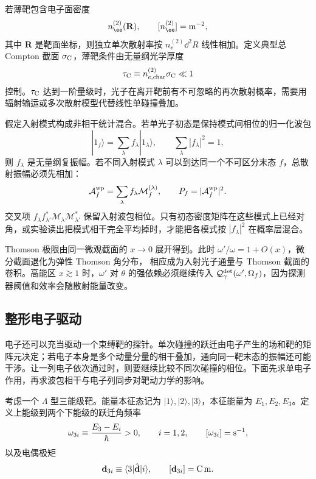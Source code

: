 若薄靶包含电子面密度
\begin{equation*}
n_\ee^{(2)}(\mathbf R),
\qquad
[n_\ee^{(2)}]={\rm m^{-2}},
\end{equation*}
其中 $\mathbf R$ 是靶面坐标，则独立单次散射率按 $n_\ee^{(2)}\dd^2 R$ 线性相加。定义典型总 Compton 截面 $\sigma_{\rm C}$，薄靶条件由无量纲光学厚度
\begin{equation*}
\tau_{\rm C}
\equiv n_{e,{\rm char}}^{(2)}\sigma_{\rm C}
\ll1
\end{equation*}
控制。$\tau_{\rm C}$ 达到一阶量级时，光子在离开靶前有不可忽略的再次散射概率，需要用辐射输运或多次散射模型代替线性单碰撞叠加。

 假定入射模式构成非相干统计混合。若单光子初态是保持模式间相位的归一化波包
\begin{equation*}
|1_f\rangle
=\sum_\lambda f_\lambda|1_\lambda\rangle,
\qquad
\sum_\lambda|f_\lambda|^2=1,
\end{equation*}
则 $f_\lambda$ 是无量纲复振幅。若不同入射模式 $\lambda$ 可以到达同一个不可区分末态 $f$，总散射振幅必须先相加：
\begin{equation*}
\mathcal A_f^{\rm wp}
=\sum_\lambda f_\lambda\mathcal M_f^{(\lambda)},
\qquad
P_f=|\mathcal A_f^{\rm wp}|^2.
\end{equation*}
交叉项 $f_\lambda f_{\lambda'}^*\mathcal M_\lambda\mathcal M_{\lambda'}^*$ 保留入射波包相位。只有初态密度矩阵在这些模式上已经对角，或实验读出把模式相干完全平均掉时，才能把各模式按 $|f_\lambda|^2$ 在概率层混合。

Thomson 极限由同一微观截面的 $x\to0$ 展开得到。此时 $\omega'/\omega=1+O(x)$，微分截面退化为弹性 Thomson 角分布， 相应成为入射光子通量与 Thomson 截面的卷积。高能区 $x\gtrsim1$ 时，$\omega'$ 对 $\theta$ 的强依赖必须继续传入 $\mathcal Q_{\gamma}^{\rm det}(\omega',\Omega_f)$，因为探测器阈值和效率会随散射能量改变。

\subsection{整形电子驱动}\label{subsec:shaped-electron-drive-dp19}

电子还可以充当驱动一个束缚靶的探针。单次碰撞的跃迁由电子产生的场和靶的矩阵元决定；若电子本身是多个动量分量的相干叠加，通向同一靶末态的振幅还可能干涉。让一列电子依次通过时，则要继续比较不同次碰撞的相位。下面先求单电子作用，再求波包相干与电子列同步对靶动力学的影响。

考虑一个 $\Lambda$ 型三能级靶。能量本征态记为 $|1\rangle,|2\rangle,|3\rangle$，本征能量为 $E_1,E_2,E_3$。定义上能级到两个下能级的跃迁角频率
\begin{equation*}
\omega_{3i}\equiv\frac{E_3-E_i}{\hbar}>0,
\qquad i=1,2,
\qquad [\omega_{3i}]={\rm s^{-1}},
\end{equation*}
以及电偶极矩
\begin{equation*}
\mathbf d_{3i}\equiv\langle3|\hat{\mathbf d}|i\rangle,
\qquad
[\mathbf d_{3i}]={\rm C\,m}.
\end{equation*}

